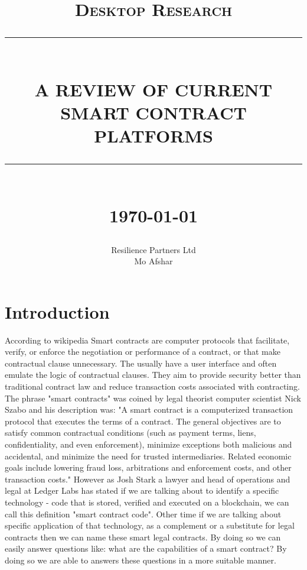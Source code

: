 \documentclass[12pt]{article}
\newcommand{\HRule}[1]{\rule{\linewidth}{#1}}
\begin{document}
\title{ \normalsize \textsc{Desktop Research}
		\\ [2.0cm]
		\HRule{0.5pt} \\
		\LARGE \textbf{\uppercase{A review of current smart contract platforms}}
		\HRule{2pt} \\ [0.5cm]
		\normalsize \today \vspace*{5\baselineskip}}

\date{}

\author{
		Resilience Partners Ltd \\ 
		Mo Afshar\\
				 }

\maketitle
\newpage
\tableofcontents
\newpage

\sectionfont{\scshape}


\section{Introduction}
According to wikipedia Smart contracts are computer protocols that facilitate, verify, or enforce the negotiation or performance of a contract, or that make contractual clause unnecessary. The usually have a user interface and often emulate the logic of contractual clauses. They aim to provide security better than traditional contract law and reduce transaction costs associated with contracting. 
\newline
\newline
The phrase "smart contracts" was coined by legal theorist computer scientist Nick Szabo and his description was: "A smart contract is a computerized transaction protocol that executes the terms of a contract. The general objectives are to satisfy common contractual conditions (such as payment terms, liens, confidentiality, and even enforcement), minimize exceptions both malicious and accidental, and minimize the need for trusted intermediaries. Related economic goals include lowering fraud loss, arbitrations and enforcement costs, and other transaction costs."
\newline
\newline 
However as Josh Stark a lawyer and head of operations and legal at Ledger Labs has stated if we are talking about to identify a specific technology - code that is stored, verified and executed on a blockchain, we can call this definition "smart contract code". Other time if we are talking about specific application of that technology, as a complement or a substitute for legal contracts then we can name these smart legal contracts. By doing so we can easily answer questions like: what are the capabilities of a smart contract? By doing so we are able to answers these questions in a more suitable manner. 
\newpage
\end{document}
